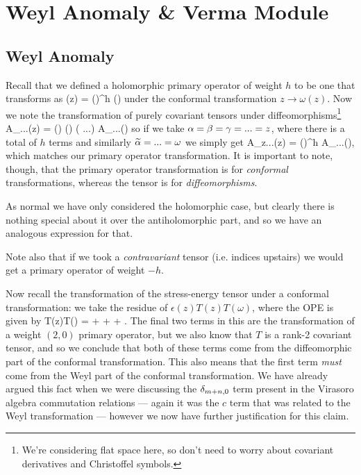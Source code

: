 \chapter{Weyl Anomaly \& Verma Module}

\section{Weyl Anomaly}

Recall that we defined a holomorphic primary operator of weight $h$ to be one that transforms as 
\bse 
    \cO(z) = \bigg(\bigg)^{h} \cO(\omega)
\ese 
under the conformal transformation $z\to \omega(z)$. Now we note the transformation of purely covariant tensors under diffeomorphisms\footnote{We're considering flat space here, so don't need to worry about covariant derivatives and Christoffel symbols.}
\bse 
   A_{\a\beta\gamma...}(z) = \bigg(\frac{\p \widetilde{\a}}{\p\a}\bigg) \bigg(\frac{\p \widetilde{\beta}}{\p \beta}\bigg) \bigg( \frac{\p\widetilde{\gamma}}{\p\gamma} ...\bigg)  A_{\widetilde{\a}\widetilde{\beta}\widetilde{\gamma}...}(\omega) 
\ese
so if we take $\alpha=\beta=\gamma = ... = z$, where there is a total of $h$ terms and similarly $\widetilde{\alpha} = ...= \omega$ we simply get 
\bse 
    A_{z...}(z) = \bigg(\bigg)^h A_{\omega...}(\omega),
\ese 
which matches our primary operator transformation. It is important to note, though, that the primary operator transformation is for \textit{conformal} transformations, whereas the tensor is for \textit{diffeomorphisms}. 

\br 
As normal we have only considered the holomorphic case, but clearly there is nothing special about it over the antiholomorphic part, and so we have an analogous expression for that. 
\er 

\br 
Note also that if we took a \textit{contravariant} tensor (i.e. indices upstairs) we would get a primary operator of weight $-h$. 
\er 

Now recall the transformation of the stress-energy tensor under a conformal transformation: we take the residue of $\epsilon(z)T(z)T(\omega)$, where the OPE is given by
\bse 
    T(z)T(\omega) =  +  +  + . 
\ese 
The final two terms in this are the transformation of a weight $(2,0)$ primary operator, but we also know that $T$ is a rank-2 covariant tensor, and so we conclude that both of these terms come from the diffeomorphic part of the conformal transformation. This also means that the first term \textit{must} come from the Weyl part of the conformal transformation. We have already argued this fact when we were discussing the $\delta_{m+n,0}$ term present in the Virasoro algebra commutation relations --- again it was the $c$ term that was related to the Weyl transformation --- however we now have further justification for this claim.

